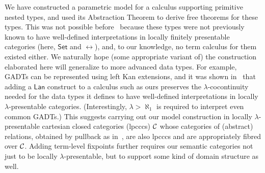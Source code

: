 \documentclass[runningheads]{llncs}
\newcommand{\set}{\mathsf{Set}}
\begin{document}
We have constructed a parametric model for a calculus supporting
primitive nested types, and used its Abstraction Theorem to derive
free theorems for these types.  This was not possible
before~\cite{jp19} because these types were not previously known to
have well-defined interpretations in locally finitely presentable
categories (here, $\set$ and $\rel$), and, to our knowledge, no term
calculus for them existed either. We naturally hope (some appropriate
variant of) the construction elaborated here will generalize to more
advanced data types. For example, GADTs can be represented using left
Kan extensions, and it was shown in~\cite{jp19} that adding a
$\mathsf{Lan}$ construct to a calculus such as ours preserves the
$\lambda$-cocontinuity needed for the data types it defines to have
well-defined interpretations in locally $\lambda$-presentable
categories. (Interestingly, $\lambda > \aleph_1$ is required to
interpret even common GADTs.) This suggests carrying out our model
construction in locally $\lambda$-presentable cartesian closed
categories (lpcccs) $\cal C$ whose categories of (abstract) relations,
obtained by pullback as in~\cite{jac99}, are also lpcccs and are
appropriately fibred over $\cal C$. Adding term-level fixpoints
further requires our semantic categories not just to be locally
$\lambda$-presentable, but to support some kind of domain structure as
well.

\pagebreak
\end{document}
